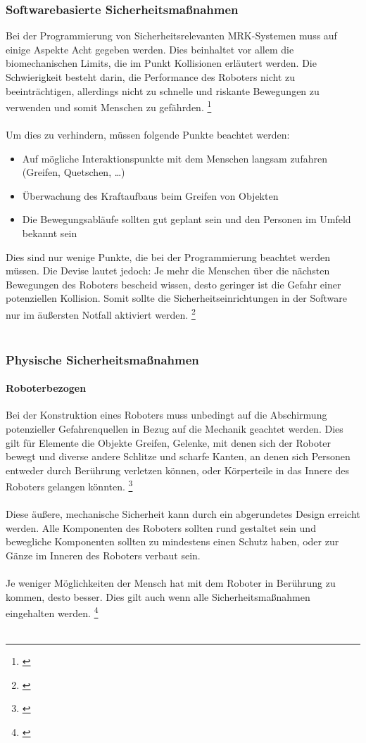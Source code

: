 \documentclass[titlepage,12pt,twoside]{article}
\begin{document}
\subsubsection{Softwarebasierte Sicherheitsmaßnahmen}
Bei der Programmierung von Sicherheitsrelevanten MRK-Systemen muss auf einige 
Aspekte Acht gegeben werden. Dies beinhaltet vor allem die biomechanischen Limits, 
die im Punkt Kollisionen erläutert werden. Die Schwierigkeit besteht darin, die 
Performance des Roboters nicht zu beeinträchtigen, allerdings nicht zu schnelle 
und riskante Bewegungen zu verwenden und somit Menschen zu gefährden. \footnote{\cite{Frauenhofer21}} \\
\\
Um dies zu verhindern, müssen folgende Punkte beachtet werden: \\
\begin{itemize}
	\item Auf mögliche Interaktionspunkte mit dem Menschen langsam zufahren 
	(Greifen, Quetschen, …)
	\item Überwachung des Kraftaufbaus beim Greifen von Objekten
	\item Die Bewegungsabläufe sollten gut geplant sein und den Personen im Umfeld bekannt sein
\end{itemize}
\hfill \break
Dies sind nur wenige Punkte, die bei der Programmierung beachtet werden müssen. 
Die Devise lautet jedoch: Je mehr die Menschen über die nächsten Bewegungen des 
Roboters bescheid wissen, desto geringer ist die Gefahr einer potenziellen 
Kollision. Somit sollte die Sicherheitseinrichtungen in der Software nur im 
äußersten Notfall aktiviert werden. \footnote{\cite{Frauenhofer21}} \\
\\
\subsubsection{Physische Sicherheitsmaßnahmen}
\paragraph{Roboterbezogen}
\hfill \break
\hfill \break
Bei der Konstruktion eines Roboters muss unbedingt auf die Abschirmung 
potenzieller Gefahrenquellen in Bezug auf die Mechanik geachtet werden. Dies gilt 
für Elemente die Objekte Greifen, Gelenke, mit denen sich der Roboter bewegt und 
diverse andere Schlitze und scharfe Kanten, an denen sich Personen entweder durch 
Berührung verletzen können, oder Körperteile in das Innere des Roboters gelangen 
könnten. \footnote{\cite{Frauenhofer22}} \\
\\
Diese äußere, mechanische Sicherheit kann durch ein abgerundetes Design erreicht 
werden. Alle Komponenten des Roboters sollten rund gestaltet sein und bewegliche 
Komponenten sollten zu mindestens einen Schutz haben, oder zur Gänze im Inneren 
des Roboters verbaut sein. \\
\\
Je weniger Möglichkeiten der Mensch hat mit dem Roboter in Berührung zu kommen, 
desto besser. Dies gilt auch wenn alle Sicherheitsmaßnahmen eingehalten werden. \footnote{\cite{Frauenhofer22}} \\
\\
\end{document}
